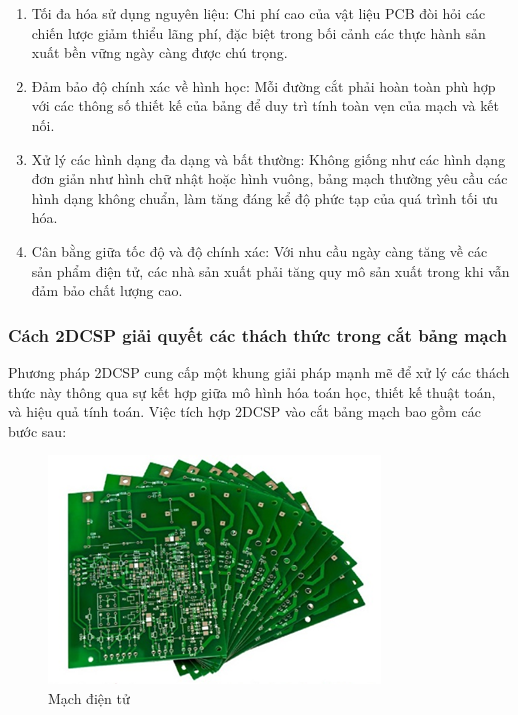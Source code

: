 \begin{enumerate}[1.  ]
    \item Tối đa hóa sử dụng nguyên liệu: Chi phí cao của vật liệu PCB đòi hỏi các chiến lược giảm thiểu lãng phí, đặc biệt trong bối cảnh các thực hành sản xuất bền vững ngày càng được chú trọng.
    \item Đảm bảo độ chính xác về hình học: Mỗi đường cắt phải hoàn toàn phù hợp với các thông số thiết kế của bảng để duy trì tính toàn vẹn của mạch và kết nối.
    \item Xử lý các hình dạng đa dạng và bất thường: Không giống như các hình dạng đơn giản như hình chữ nhật hoặc hình vuông, bảng mạch thường yêu cầu các hình dạng không chuẩn, làm tăng đáng kể độ phức tạp của quá trình tối ưu hóa.
    \item Cân bằng giữa tốc độ và độ chính xác: Với nhu cầu ngày càng tăng về các sản phẩm điện tử, các nhà sản xuất phải tăng quy mô sản xuất trong khi vẫn đảm bảo chất lượng cao.
\end{enumerate}

\subsubsection{Cách 2DCSP giải quyết các thách thức trong cắt bảng mạch}
Phương pháp 2DCSP cung cấp một khung giải pháp mạnh mẽ để xử lý các thách thức này thông qua sự kết hợp giữa mô hình hóa toán học, thiết kế thuật toán, và hiệu quả tính toán. Việc tích hợp 2DCSP vào cắt bảng mạch bao gồm các bước sau:

\begin{figure}[!htp]
    \centering
    \includegraphics[width=0.3\linewidth]{circuits.png}
    \caption{Mạch điện tử}
    \label{fig:enter-label}
\end{figure}

